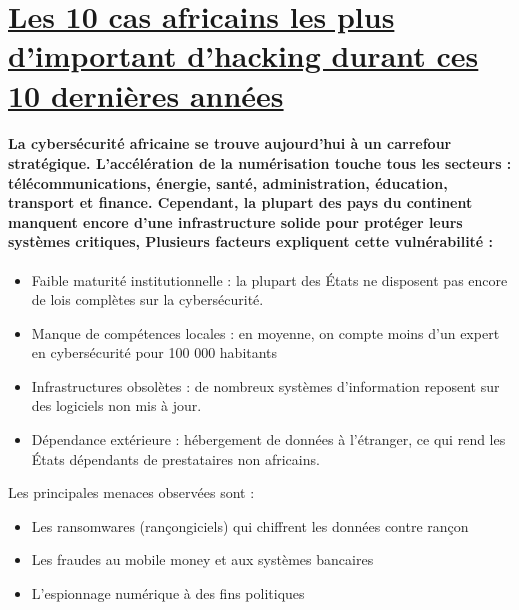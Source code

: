 \documentclass{article}
\begin{document}
\section{\underline{Les 10 cas africains les plus d'important d'hacking durant ces 10 dernières années}}

\paragraph{La cybersécurité africaine se trouve aujourd’hui à un carrefour stratégique. L’accélération de la numérisation touche tous les secteurs : télécommunications, énergie, santé, administration, éducation, transport et finance. Cependant, la plupart des pays du continent manquent encore d’une infrastructure solide pour protéger leurs systèmes critiques, Plusieurs facteurs expliquent cette vulnérabilité :}

\begin{itemize}

\item  Faible maturité institutionnelle : la plupart des États ne disposent pas encore de lois complètes sur la cybersécurité.

\item  Manque de compétences locales : en moyenne, on compte moins d’un expert en cybersécurité pour 100 000 habitants

\item  Infrastructures obsolètes : de nombreux systèmes d’information reposent sur des logiciels non mis à jour.

\item  Dépendance extérieure : hébergement de données à l’étranger, ce qui rend les États dépendants de prestataires non africains. 

\end{itemize}

Les principales menaces observées sont :

\begin{itemize}
\item Les ransomwares (rançongiciels) qui chiffrent les données contre rançon 

\item  Les fraudes au mobile money et aux systèmes bancaires 

\item L’espionnage numérique à des fins politiques 

\end{itemize}
\end{document}
